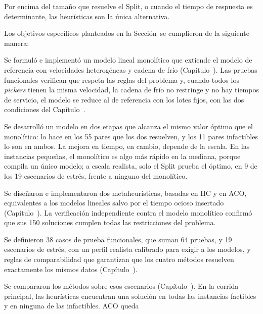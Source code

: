 Por encima del tamaño que resuelve el Split, o cuando el tiempo de respuesta
es determinante, las heurísticas son la única alternativa.

\stopsubsection

\stopsection

\startsection[title={Conclusiones}, reference=sec:conclusiones]

Los objetivos específicos planteados en la Sección~ se
cumplieron de la siguiente manera:
\startitemize[n]
	\item Se formuló e implementó un modelo lineal monolítico que extiende el
	modelo de referencia con velocidades heterogéneas y cadena de frío
	(Capítulo~\in[Capitulo_3]). Las pruebas funcionales verifican que respeta
	las reglas del problema y, cuando todos los {\em pickers} tienen la misma
	velocidad, la cadena de frío no restringe y no hay tiempos de servicio, el
	modelo se reduce al de referencia con los lotes fijos, con las dos
	condiciones del Capítulo~\in[Capitulo_3].
	\item Se desarrolló un modelo en dos etapas que alcanza el mismo valor
	óptimo que el monolítico: lo hace en los 55 pares que los dos resuelven, y
	los 11 pares infactibles lo son en ambos. La mejora en tiempo, en cambio,
	depende de la escala. En las instancias pequeñas, el monolítico es algo
	más rápido en la mediana, porque compila un único modelo; a escala realista, solo el
	Split prueba el óptimo, en 9 de los 19 escenarios de estrés, frente a
	ninguno del monolítico.
	\item Se diseñaron e implementaron dos metaheurísticas, basadas en HC y en
	ACO, equivalentes a los modelos lineales salvo por el tiempo ocioso
	insertado (Capítulo~\in[Capitulo_4]). La verificación independiente contra
	el modelo monolítico confirmó que sus 150 soluciones cumplen todas las
	restricciones del problema.
	\item Se definieron 38 casos de prueba funcionales, que suman 64 pruebas,
	y 19 escenarios de estrés, con un perfil realista calibrado para exigir a los modelos, y reglas de comparabilidad que
	garantizan que los cuatro métodos resuelven exactamente los mismos datos
	(Capítulo~\in[Capitulo_5]).
	\item Se compararon los métodos sobre esos escenarios
	(Capítulo~\in[Capitulo_6]). En la corrida principal, las heurísticas
	encuentran una solución en todas las instancias factibles y en ninguna de
	las infactibles. ACO queda
